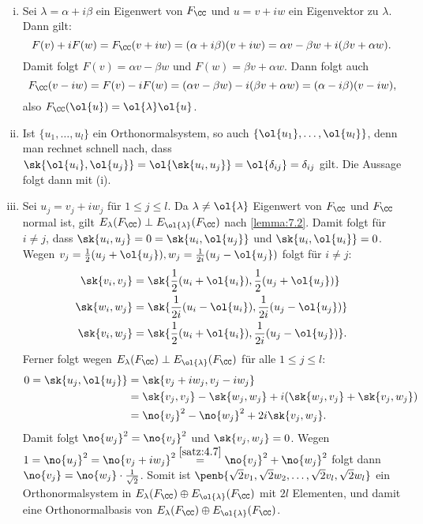 \begin{beweis}
	\mbox{} \\[-.9cm]
	\begin{enumerate}[(i)]
		\item Sei $\lambda = \alpha + i \beta$ ein Eigenwert von $F_{\CC}$ und $u = v+iw$ ein Eigenvektor zu $\lambda$.
		Dann gilt:
		\[
			F(v) + i F(w) = F_{\CC}(v+iw) = (\alpha + i\beta)(v+iw) = \alpha v - \beta w +i(\beta v + \alpha w).
		\]
		Damit folgt $F(v) = \alpha v - \beta w$ und $F(w) = \beta v + \alpha w$.
		\newpage
		Dann folgt auch
		\[
			F_{\CC}(v-iw) = F(v) - iF(w) = (\alpha v - \beta w)-i(\beta v + \alpha w) = (\alpha - i\beta)(v-iw),
		\]
		also $F_{\CC}(\ol{u}) = \ol{\lambda} \ol{u}$.
		\item Ist $\{u_1,\dots,u_l\}$ ein Orthonormalsystem, so auch $\{\ol{u_1},\dots,\ol{u_l}\}$, denn man rechnet schnell nach, dass $\sk{\ol{u_i},\ol{u_j}} = \ol{\sk{u_i,u_j}} = \ol{\delta_{ij}} = \delta_{ij}$ gilt.
		Die Aussage folgt dann mit (i).
		\item Sei $u_j = v_j + iw_j$ für $1 \leq j \leq l$.
		Da $\lambda \neq \ol{\lambda}$ Eigenwert von $F_{\CC}$ und $F_{\CC}$ normal ist, gilt $E_{\lambda}(F_{\CC}) \perp E_{\ol{\lambda}}(F_{\CC})$ nach \autoref{lemma:7.2}.
		Damit folgt für $i \neq j$, dass $\sk{u_i,u_j} = 0 = \sk{u_i,\ol{u_j}}$ und $\sk{u_i,\ol{u_i}} = 0$.
		Wegen $v_j = \frac{1}{2}(u_j + \ol{u_j}), w_j = \frac{1}{2i}(u_j - \ol{u_j})$ folgt für $i \neq j$:
		\begin{align*}
			\sk{v_i,v_j} &= \sk{\frac{1}{2}(u_i+\ol{u_i}),\frac{1}{2}(u_j+\ol{u_j})} \\
			\sk{w_i,w_j} &= \sk{\frac{1}{2i}(u_i-\ol{u_i}),\frac{1}{2i}(u_j-\ol{u_j})} \\
			\sk{v_i,w_j} &= \sk{\frac{1}{2}(u_i+\ol{u_i}),\frac{1}{2i}(u_j-\ol{u_j})}.
		\end{align*}
		Ferner folgt wegen $E_{\lambda}(F_{\CC}) \perp E_{\ol{\lambda}}(F_{\CC})$ für alle $1 \leq j \leq l$:
		\begin{align*}
			0 = \sk{u_j,\ol{u_j}} &= \sk{v_j + iw_j,v_j -iw_j} \\
			&= \sk{v_j,v_j} - \sk{w_j,w_j} + i(\sk{w_j,v_j} + \sk{v_j,w_j}) \\
			&= \no{v_j}^2 - \no{w_j}^2 + 2i \sk{v_j,w_j}.
		\end{align*}
		Damit folgt $\no{w_j}^2 = \no{v_j}^2$ und $\sk{v_j,w_j} = 0$.
		Wegen $1 = \no{u_j}^2 = \no{v_j+iw_j}^2 \stackrel{\ref{satz:4.7}}{=} \no{v_j}^2 + \no{w_j}^2$ folgt dann $\no{v_j} = \no{w_j} \cdot \frac{1}{\sqrt{2}}$.
		Somit ist $\penb{\sqrt{2} v_1, \sqrt{2} w_2, \dots, \sqrt{2} v_l,\sqrt{2} w_l}$ ein Orthonormalsystem in $E_{\lambda}(F_{\CC}) \oplus E_{\ol{\lambda}}(F_{\CC})$ mit $2l$ Elementen, und damit eine Orthonormalbasis von $E_{\lambda}(F_{\CC}) \oplus E_{\ol{\lambda}}(F_{\CC})$. 
	\end{enumerate}
\end{beweis}

